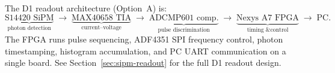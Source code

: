 The D1 readout architecture (Option~A) is:
\begin{equation*}
  \underbrace{\text{S14420 SiPM}}_{\text{photon detection}}
  \;\to\;
  \underbrace{\text{MAX40658 TIA}}_{\text{current--voltage}}
  \;\to\;
  \underbrace{\text{ADCMP601 comp.}}_{\text{pulse discrimination}}
  \;\to\;
  \underbrace{\text{Nexys A7 FPGA}}_{\text{timing \& control}}
  \;\to\; \text{PC}.
\end{equation*}
The FPGA runs pulse sequencing, ADF4351 SPI frequency control, photon timestamping,
histogram accumulation, and PC UART communication on a single board.
See Section~\ref{sec:sipm-readout} for the full D1 readout design.
